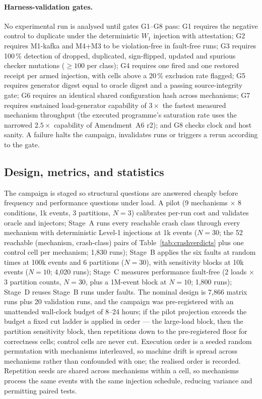 \paragraph{Harness-validation gates.} No experimental run is analysed until gates G1--G8 pass:
G1 requires the negative control to duplicate under the deterministic $W_1$ injection with
attestation; G2 requires M1-kafka and M4+M3 to be violation-free in fault-free runs; G3 requires
100\,\% detection of dropped, duplicated, sign-flipped, updated and spurious checker mutations
($\geq100$ per class); G4 requires one fired and one restored receipt per armed injection, with
cells above a 20\,\% exclusion rate flagged; G5 requires generator digest equal to oracle digest
and a passing source-integrity gate; G6 requires an identical shared configuration hash across
mechanisms; G7 requires sustained load-generator capability of $3\times$ the fastest measured
mechanism throughput (the executed programme's saturation rate uses the narrowed $2.5\times$
capability of Amendment~A6 r2); and G8 checks clock and host sanity. A failure halts the
campaign, invalidates runs or triggers a rerun according to the gate.

\subsection{Design, metrics, and statistics}
\label{sec:method:design}

The campaign is staged so structural questions are answered cheaply before frequency and
performance questions under load. A pilot (9 mechanisms $\times$ 8 conditions, 1k events, 3
partitions, $N=3$) calibrates per-run cost and validates oracle and injectors; Stage~A runs every
reachable crash class through every mechanism with deterministic Level-1 injections at 1k events
($N=30$; the 52 reachable (mechanism, crash-class) pairs of Table~\ref{tab:crashverdicts} plus one
control cell per mechanism; 1{,}830 runs); Stage~B applies the six faults at random times at 100k
events and 6 partitions ($N=30$), with sensitivity blocks at 10k events ($N=10$; 4{,}020 runs);
Stage~C measures performance fault-free (2 loads $\times$ 3 partition counts, $N=30$, plus a
1M-event block at $N=10$; 1{,}800 runs); Stage~D reuses Stage~B runs under faults. The nominal design is 7{,}866 matrix runs plus 20 validation runs,
and the campaign was pre-registered with an unattended wall-clock budget of 8--24 hours; if the
pilot projection exceeds the budget a fixed cut ladder is applied in order --- the large-load
block, then the partition sensitivity block, then repetitions down to the pre-registered floor for
correctness cells; control cells are never cut. Execution order is a seeded random permutation
with mechanisms interleaved, so machine drift is spread across mechanisms rather than confounded
with one; the realised order is recorded. Repetition seeds are shared across mechanisms within a
cell, so mechanisms process the same events with the same injection schedule, reducing variance
and permitting paired tests.

